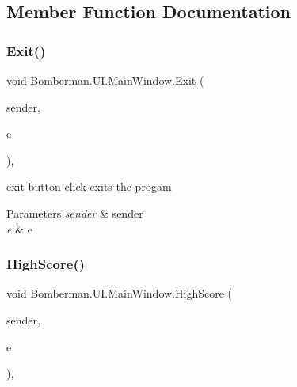 \subsection{Member Function Documentation}
\mbox{\label{class_bomberman_1_1_u_i_1_1_main_window_a0e29abcc661e72b3792ec8713aea4ee3}} 
\subsubsection{\texorpdfstring{Exit()}{Exit()}}
{\footnotesize\ttfamily void Bomberman.\+U\+I.\+Main\+Window.\+Exit (\begin{DoxyParamCaption}\item[{object}]{sender,  }\item[{Routed\+Event\+Args}]{e }\end{DoxyParamCaption})\hspace{0.3cm}{\ttfamily [inline]}, {\ttfamily [private]}}



exit button click exits the progam 


\begin{DoxyParams}{Parameters}
{\em sender} & sender\\
\hline
{\em e} & e\\
\hline
\end{DoxyParams}
\mbox{\label{class_bomberman_1_1_u_i_1_1_main_window_ae607495bbefafe350391c5c39dcdba21}} 
\subsubsection{\texorpdfstring{HighScore()}{HighScore()}}
{\footnotesize\ttfamily void Bomberman.\+U\+I.\+Main\+Window.\+High\+Score (\begin{DoxyParamCaption}\item[{object}]{sender,  }\item[{Routed\+Event\+Args}]{e }\end{DoxyParamCaption})\hspace{0.3cm}{\ttfamily [inline]}, {\ttfamily [private]}}



